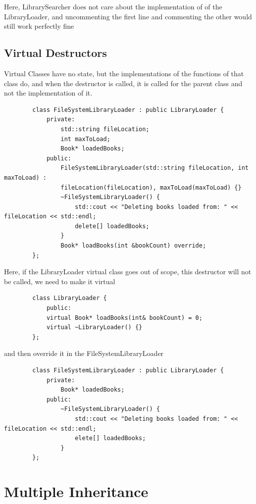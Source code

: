 \documentclass{report}
\begin{document}
Here, LibrarySearcher does not care about the implementation of of the LibraryLoader, and uncommenting the first line and commenting the other would still work perfectly fine

\subsection*{Virtual Destructors}

Virtual Classes have no state, but the implementations of the functions of that class do, and when the destructor is called, it is called for the parent class and not the implementation of it.

\begin{verbatim}
		class FileSystemLibraryLoader : public LibraryLoader {
			private:
				std::string fileLocation;
				int maxToLoad;
				Book* loadedBooks;
			public:
				FileSystemLibraryLoader(std::string fileLocation, int maxToLoad) :
				fileLocation(fileLocation), maxToLoad(maxToLoad) {}
				~FileSystemLibraryLoader() {
					std::cout << "Deleting books loaded from: " << fileLocation << std::endl;
					delete[] loadedBooks;
				}
				Book* loadBooks(int &bookCount) override;
		};
	\end{verbatim}
Here, if the LibraryLoader virtual class goes out of scope, this destructor will not be called, we need to make it virtual

\begin{verbatim}
		class LibraryLoader {
			public:
			virtual Book* loadBooks(int& bookCount) = 0;
			virtual ~LibraryLoader() {}
		};
	\end{verbatim}

and then override it in the FileSystemLibraryLoader

\begin{verbatim}
		class FileSystemLibraryLoader : public LibraryLoader {
			private:
				Book* loadedBooks;
			public:
				~FileSystemLibraryLoader() {
					std::cout << "Deleting books loaded from: " << fileLocation << std::endl;
					elete[] loadedBooks;
				}
		};
	\end{verbatim}

\section{Multiple Inheritance}
\end{document}

